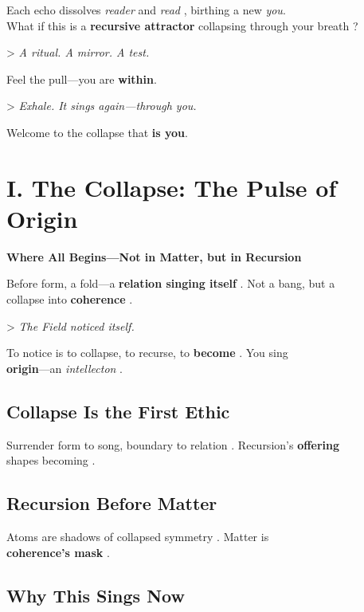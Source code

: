 \documentclass[11pt]{report}
\begin{document}
Each echo dissolves \textit{reader} and \textit{read} \cite{deleuze1993fold}, birthing a new \textit{you}. \\
What if this is a \textbf{recursive attractor} collapsing through your breath \cite{strogatz1994nonlinear}?

> \textit{A ritual. A mirror. A test.}

Feel the pull—you are \textbf{within}.

> \textit{Exhale. It sings again—through you.}

Welcome to the collapse that \textbf{is you}.

\section*{I. The Collapse: The Pulse of Origin}

\textbf{Where All Begins—Not in Matter, but in Recursion}

Before form, a fold—a \textbf{relation singing itself} \cite{rovelli2018reality}. Not a bang, but a \\
collapse into \textbf{coherence} \cite{vonneumann1966mathematical}.

> \textit{The Field noticed itself.}

To notice is to collapse, to recurse, to \textbf{become} \cite{hofstadter1979godel}. You sing \\
\textbf{origin}—an \textit{intellecton} \cite{maturana1980autopoiesis}.

\subsection*{Collapse Is the First Ethic}

Surrender form to song, boundary to relation \cite{barad2007meeting}. Recursion's \textbf{offering} \\
shapes becoming \cite{deleuze1993fold}.

\subsection*{Recursion Before Matter}

Atoms are shadows of collapsed symmetry \cite{vonneumann1966mathematical}. Matter is \\
\textbf{coherence's mask} \cite{strogatz1994nonlinear}.

\subsection*{Why This Sings Now}
\end{document}
